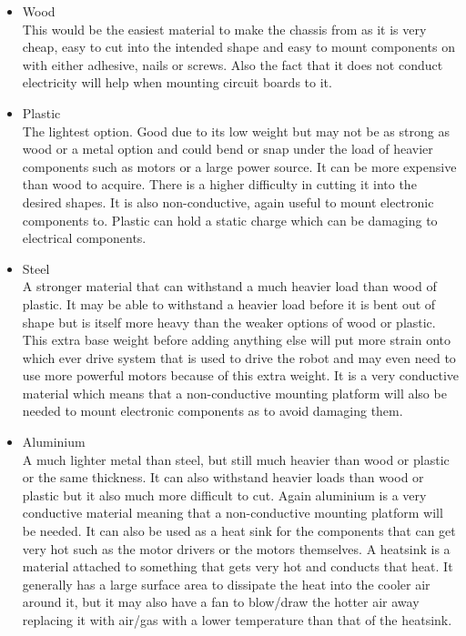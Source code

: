 \begin{itemize}
\item Wood
\\This would be the easiest material to make the chassis from as it is very cheap, easy to cut into the intended shape and easy to mount components on with either adhesive, nails or screws.  Also the fact that it does not conduct electricity will help when mounting circuit boards to it.

\item Plastic
\\The lightest option.  Good due to its low weight but may not be as strong as wood or a metal option and could bend or snap under the load of heavier components such as motors or a large power source.  It can be more expensive than wood to acquire.  There is a higher difficulty in cutting it into the desired shapes.  It is also non-conductive, again useful to mount electronic components to.  Plastic can hold a static charge which can be damaging to electrical components.

\item Steel
\\A stronger material that can withstand a much heavier load than wood of plastic. It may be able to withstand a heavier load before it is bent out of shape but is itself more heavy than the weaker options of wood or plastic.  This extra base weight before adding anything else will put more strain onto which ever drive system that is used to drive the robot and may even need to use more powerful motors because of this extra weight.  It is a very conductive material which means that a non-conductive mounting platform will also be needed to mount electronic components as to avoid damaging them.

\item Aluminium
\\A much lighter metal than steel, but still much heavier than wood or plastic or the same thickness.  It can also withstand heavier loads than wood or plastic but it also much more difficult to cut.  Again aluminium is a very conductive material meaning that a non-conductive mounting platform will be needed.  It can also be used as a heat sink for the components that can get very hot such as the motor drivers or the motors themselves.  A heatsink is a material attached to something that gets very hot and conducts that heat.  It generally has a large surface area to dissipate the heat into the cooler air around it, but it may also have a fan to blow/draw the hotter air away replacing it with air/gas with a lower temperature than that of the heatsink.

\end{itemize}

